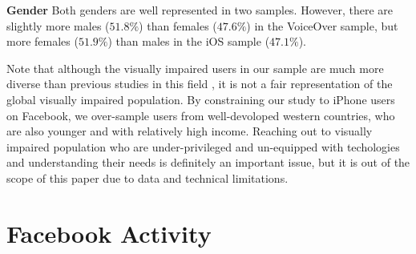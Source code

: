 \documentclass{sigchi}
\begin{document}
\textbf{Gender} Both genders are well represented in two samples. However, there are slightly more males ($51.8\%$) than females ($47.6\%$) in the VoiceOver sample, but more females ($51.9\%$) than males in the iOS sample ($47.1\%$).

Note that although the visually impaired users in our sample are much more diverse than previous studies in this field \cite{wentz2011,brady2013chi,brady2013cscw}, it is not a fair representation of the global visually impaired population. By constraining our study to iPhone users on Facebook,  we over-sample users from well-devoloped western countries, who are also younger and with relatively high income. Reaching out to visually impaired population who are under-privileged and un-equipped with techologies and understanding their needs is definitely an important issue, but it is out of the scope of this paper due to data and technical limitations.



\section{Facebook Activity}
\end{document}

